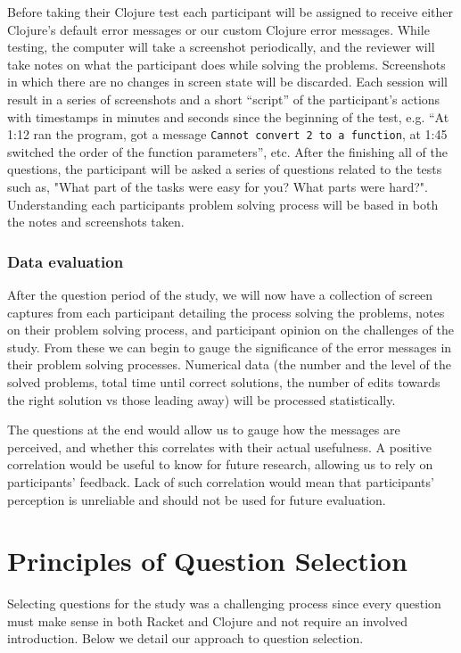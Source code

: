 \documentclass[submission,copyright,creativecommons]{eptcs}
\begin{document}
Before taking their Clojure test each participant will  be assigned to receive either Clojure's default error messages or our custom Clojure error messages.
While testing, the computer will take a screenshot periodically, and the reviewer will take notes on what the participant does while solving the problems.
Screenshots in which there are no changes in screen state will be discarded. 
Each session will result in a series of screenshots and a short ``script'' of the participant's actions with timestamps in minutes and seconds since the beginning of the test, e.g. ``At 1:12 ran the program, got a message \texttt{Cannot convert 2 to a function}, at 1:45 switched the order of the function parameters'', etc.
After the finishing all of the questions, the participant will be asked a series of questions related to the tests such as, "What part of the tasks were easy for you? What parts were hard?".
Understanding each participants problem solving process will be based in both the notes and screenshots taken.

\subsubsection{Data evaluation}\label{subsec:evaluation}

After the question period of the study, we will now have a collection of screen captures from each participant detailing the process solving the problems, notes on their problem solving process, and participant opinion on the challenges of the study.
From these we can begin to gauge the significance of the error messages in their problem solving processes. 
Numerical data (the number and the level of the solved problems, total time until correct solutions, the number of edits towards the right solution vs those leading away) will be processed statistically. 

The questions at the end would allow us to gauge how the messages are perceived, and whether this correlates with their actual usefulness. A positive correlation would be useful to know for future research, allowing us to rely on participants' feedback. 
Lack of such correlation would mean that participants' perception is unreliable and should not be used for future evaluation.  

\section{Principles of Question Selection}\label{sec:select}
	Selecting questions for the study was a challenging process since every question must make sense in both Racket and Clojure and not require an involved introduction. Below we detail our approach to question selection.
\end{document}
